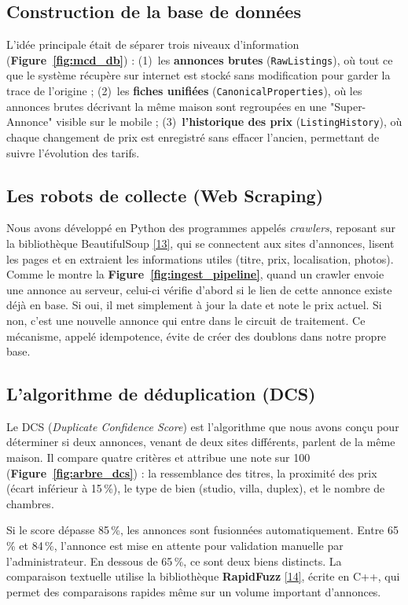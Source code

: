 \subsection{Construction de la base de donn\'ees}
L'id\'ee principale \'etait de s\'eparer trois niveaux d'information (\textbf{Figure~\ref{fig:mcd_db}}) : (1)~les \textbf{annonces brutes} (\texttt{RawListings}), o\`u tout ce que le syst\`eme r\'ecup\`ere sur internet est stock\'e sans modification pour garder la trace de l'origine ; (2)~les \textbf{fiches unifi\'ees} (\texttt{CanonicalProperties}), o\`u les annonces brutes d\'ecrivant la m\^eme maison sont regroup\'ees en une "Super-Annonce" visible sur le mobile ; (3)~\textbf{l'historique des prix} (\texttt{ListingHistory}), o\`u chaque changement de prix est enregistr\'e sans effacer l'ancien, permettant de suivre l'\'evolution des tarifs.

\vspace{-4pt}
\subsection{Les robots de collecte (Web Scraping)}
Nous avons d\'evelopp\'e en Python des programmes appel\'es \emph{crawlers}, reposant sur la biblioth\`eque BeautifulSoup \hyperref[ref:beautifulsoup]{[13]}, qui se connectent aux sites d'annonces, lisent les pages et en extraient les informations utiles (titre, prix, localisation, photos). Comme le montre la \textbf{Figure~\ref{fig:ingest_pipeline}}, quand un crawler envoie une annonce au serveur, celui-ci v\'erifie d'abord si le lien de cette annonce existe d\'ej\`a en base. Si oui, il met simplement \`a jour la date et note le prix actuel. Si non, c'est une nouvelle annonce qui entre dans le circuit de traitement. Ce m\'ecanisme, appel\'e idempotence, \'evite de cr\'eer des doublons dans notre propre base.

\vspace{-4pt}
\subsection{L'algorithme de d\'eduplication (DCS)}
Le DCS (\emph{Duplicate Confidence Score}) est l'algorithme que nous avons con\c{c}u pour d\'eterminer si deux annonces, venant de deux sites diff\'erents, parlent de la m\^eme maison. Il compare quatre crit\`eres et attribue une note sur 100 (\textbf{Figure~\ref{fig:arbre_dcs}}) : la ressemblance des titres, la proximit\'e des prix (\'ecart inf\'erieur \`a 15\,\%), le type de bien (studio, villa, duplex), et le nombre de chambres.

\vspace{-2pt}
Si le score d\'epasse 85\,\%, les annonces sont fusionn\'ees automatiquement. Entre 65\,\% et 84\,\%, l'annonce est mise en attente pour validation manuelle par l'administrateur. En dessous de 65\,\%, ce sont deux biens distincts. La comparaison textuelle utilise la biblioth\`eque \textbf{RapidFuzz} \hyperref[ref:rapidfuzz]{[14]}, \'ecrite en C++, qui permet des comparaisons rapides m\^eme sur un volume important d'annonces.
